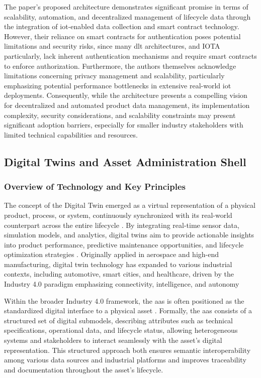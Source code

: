 The paper's proposed architecture demonstrates significant promise in terms of scalability, automation, and decentralized management of lifecycle data through the integration of \ac{iot}-enabled data collection and smart contract technology. However, their reliance on smart contracts for authentication poses potential limitations and security risks, since many \ac{dlt} architectures, and IOTA particularly, lack inherent authentication mechanisms and require smart contracts to enforce authorization. Furthermore, the authors themselves acknowledge limitations concerning privacy management and scalability, particularly emphasizing potential performance bottlenecks in extensive real-world \ac{iot} deployments. Consequently, while the architecture presents a compelling vision for decentralized and automated product data management, its implementation complexity, security considerations, and scalability constraints may present significant adoption barriers, especially for smaller industry stakeholders with limited technical capabilities and resources.

\subsection{Digital Twins and Asset Administration Shell}

\subsubsection*{Overview of Technology and Key Principles}
The concept of the Digital Twin emerged as a virtual representation of a physical product, process, or system, continuously synchronized with its real-world counterpart across the entire lifecycle \autocite{Grieves.2014, Tao.2019}. By integrating real-time sensor data, simulation models, and analytics, digital twins aim to provide actionable insights into product performance, predictive maintenance opportunities, and lifecycle optimization strategies \autocite{Fuller.2020, Kritzinger.2018}. Originally applied in aerospace and high-end manufacturing, digital twin technology has expanded to various industrial contexts, including automotive, smart cities, and healthcare, driven by the Industry 4.0 paradigm emphasizing connectivity, intelligence, and autonomy \autocite{Xu.2021, Tao.2019b}

Within the broader Industry 4.0 framework, the \ac{aas} is often positioned as the standardized digital interface to a physical asset \autocite{PlattformIndustrie4.0.2016}. Formally, the \ac{aas} consists of a structured set of digital submodels, describing attributes such as technical specifications, operational data, and lifecycle status, allowing heterogeneous systems and stakeholders to interact seamlessly with the asset’s digital representation. This structured approach both ensures semantic interoperability among various data sources and industrial platforms and improves traceability and documentation throughout the asset’s lifecycle. \autocite{PlattformIndustrie4.0.2022}

